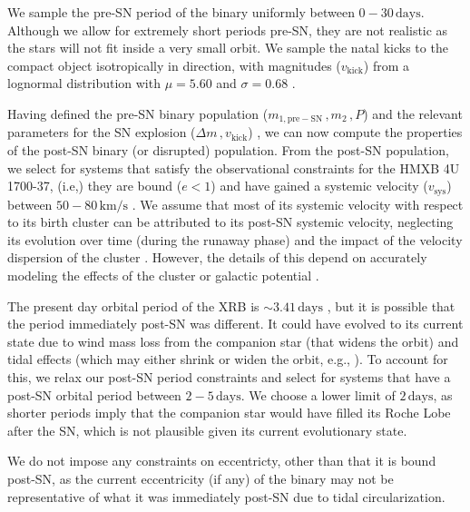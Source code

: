 \documentclass[linenumbers,trackchanges,twocolumn]{aastex701}
\begin{document}
We sample the pre-SN period of the binary uniformly between $0-30\, \mathrm{days}$. Although we allow for extremely short periods pre-SN, they are not realistic as the stars will not fit inside a very small orbit. We sample the natal kicks to the compact object isotropically in direction, with magnitudes ($v_{\mathrm{kick}}$) from a lognormal distribution with $\mu = 5.60$ and $\sigma = 0.68$ \citep{2025ApJ...989L...8D}.

Having defined the pre-SN binary population ($m_{1,\mathrm{pre-SN}}\,, m_2\,, P$) and the relevant parameters for the SN explosion ($\Delta m\,, v_{\mathrm{kick}}$)
, we can now compute the properties of the post-SN binary (or disrupted) population. From the post-SN population, we select for systems that satisfy the observational constraints for the HMXB 4U 1700-37, (i.e,) they are bound ($e<1$) and have gained a systemic velocity ($v_{\mathrm{sys}}$) between $50-80 \, \mathrm{km/s}$ \citep{2021A&A...655A..31V}. We assume that most of its systemic velocity with respect to its birth cluster can be attributed to its post-SN systemic velocity, neglecting its evolution over time (during the runaway phase) and the impact of the velocity dispersion of the cluster \citep{2021A&A...645L..10R}. However, the details of this depend on accurately modeling the effects of the cluster or galactic potential \citep{2025AJ....170..192W}.

The present day orbital period of the XRB is $ \sim 3.41 \, \mathrm{days}$ \citep{2016MNRAS.461..816I}, but it is possible that the period immediately post-SN was different. It could have evolved to its current state due to wind mass loss from the companion star (that widens the orbit) and tidal effects (which may either shrink or widen the orbit, e.g., \citealp{2024A&A...684A..35B}). To account for this, we relax our post-SN period constraints and select for systems that have a post-SN orbital period between $2-5 \, \mathrm{days}$. We choose a lower limit of $2 \, \mathrm{days}$, as shorter periods imply that the companion star would have filled its Roche Lobe after the SN, which is not plausible given its current evolutionary state.

We do not impose any constraints on eccentricty, other than that it is bound post-SN, as the current eccentricity (if any) of the binary may not be representative of what it was immediately post-SN due to tidal circularization.
\end{document}

